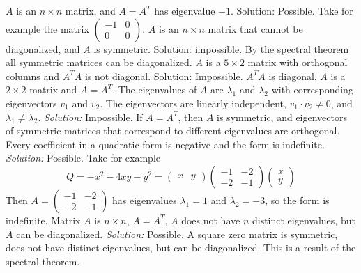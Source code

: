 \fi      
\ifnum {}
     $A$ is an $n\times n$ matrix, and $A=A^T$ has eigenvalue $-1$. 
    \ifnum {}  \setlength{\extrarowheight}{0.0cm} \fi     
    \ifnum {} {\color{DarkBlue} Solution:  Possible. Take for example the matrix $\begin{pmatrix} -1&0\\0&0 \end{pmatrix}$. } \fi
\fi      
\ifnum {}
    \setlength{\extrarowheight}{0.00cm} 
    $A$ is an $n\times n$ matrix that cannot be diagonalized, and $A$ is symmetric. 
    \ifnum {} {\color{DarkBlue} Solution:  impossible. By the spectral theorem all symmetric matrices can be diagonalized. 
    } \fi
\fi      
\ifnum {}
    \setlength{\extrarowheight}{0.00cm} 
    $A$ is a $5\times 2$ matrix with orthogonal columns and $A^TA$ is not diagonal. 
    \ifnum {} {\color{DarkBlue} Solution:  Impossible. $A^TA$ is diagonal.  
    } \fi
\fi      
\ifnum {}
    $A$ is a $2\times 2$ matrix and $A=A^T$. The eigenvalues of $A$ are $\lambda_1$ and $\lambda_2$ with corresponding eigenvectors $v_1$ and $v_2$. The eigenvectors are linearly independent, $v_1 \cdot v_2 \ne 0$, and $\lambda_1 \ne \lambda_2$. 
    \ifnum {} {\color{DarkBlue} \textit{Solution:  } Impossible. If $A=A^T$, then $A$ is symmetric, and eigenvectors of symmetric matrices that correspond to different eigenvalues are orthogonal.  } \fi
\fi      
\ifnum {}
    Every coefficient in a quadratic form is negative and the form is indefinite.  
    \ifnum {} {\color{DarkBlue} \textit{Solution:  } Possible. Take for example \setlength{\extrarowheight}{0.0cm}
     $$Q = -x^2 - 4xy - y^2 = \begin{pmatrix} x & y\end{pmatrix}\begin{pmatrix} -1&-2\\-2&-1\end{pmatrix}\begin{pmatrix} x\\y\end{pmatrix}$$ Then $A = \begin{pmatrix} -1&-2\\-2&-1\end{pmatrix}$ has eigenvalues $\lambda_1 = 1$ and $\lambda_2=-3$, so the form is indefinite. }\fi
\fi    
\ifnum {} %
     Matrix $A$ is $n\times n$, $A=A^T$, $A$ does not have $n$ distinct eigenvalues, but $A$ can be diagonalized. 
    \ifnum {} {\color{DarkBlue} \textit{Solution:  } Possible. A square zero matrix is symmetric, does not have distinct eigenvalues, but can be diagonalized. This is a result of the spectral theorem.} \fi
